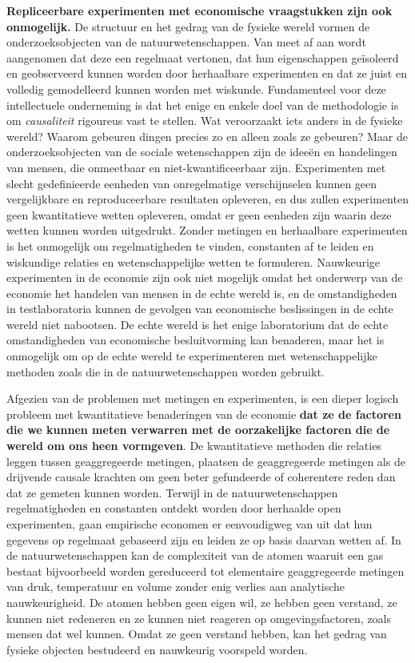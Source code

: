 \textbf{Repliceerbare experimenten met economische vraagstukken zijn ook onmogelijk.} De structuur en het gedrag van de fysieke wereld vormen de onderzoeksobjecten van de natuurwetenschappen. Van meet af aan wordt aangenomen dat deze een regelmaat vertonen, dat hun eigenschappen geïsoleerd en geobserveerd kunnen worden door herhaalbare experimenten en dat ze juist en volledig gemodelleerd kunnen worden met wiskunde. Fundamenteel voor deze intellectuele onderneming is dat het enige en enkele doel van de methodologie is om \textit{causaliteit} rigoureus vast te stellen. Wat veroorzaakt iets anders in de fysieke wereld? Waarom gebeuren dingen precies zo en alleen zoals ze gebeuren? Maar de onderzoeksobjecten van de sociale wetenschappen zijn de ideeën en handelingen van mensen, die onmeetbaar en niet-kwantificeerbaar zijn. Experimenten met slecht gedefinieerde eenheden van onregelmatige verschijnselen kunnen geen vergelijkbare en reproduceerbare resultaten opleveren, en dus zullen experimenten geen kwantitatieve wetten opleveren, omdat er geen eenheden zijn waarin deze wetten kunnen worden uitgedrukt. Zonder metingen en herhaalbare experimenten is het onmogelijk om regelmatigheden te vinden, constanten af te leiden en wiskundige relaties en wetenschappelijke wetten te formuleren. Nauwkeurige experimenten in de economie zijn ook niet mogelijk omdat het onderwerp van de economie het handelen van mensen in de echte wereld is, en de omstandigheden in testlaboratoria kunnen de gevolgen van economische beslissingen in de echte wereld niet nabootsen. De echte wereld is het enige laboratorium dat de echte omstandigheden van economische besluitvorming kan benaderen, maar het is onmogelijk om op de echte wereld te experimenteren met wetenschappelijke methoden zoals die in de natuurwetenschappen worden gebruikt.

Afgezien van de problemen met metingen en experimenten, is een dieper logisch probleem met kwantitatieve benaderingen van de economie \textbf{dat ze de factoren die we kunnen meten verwarren met de oorzakelijke factoren die de wereld om ons heen vormgeven}. De kwantitatieve methoden die relaties leggen tussen geaggregeerde metingen, plaatsen de geaggregeerde metingen als de drijvende causale krachten om geen beter gefundeerde of coherentere reden dan dat ze gemeten kunnen worden. Terwijl in de natuurwetenschappen regelmatigheden en constanten ontdekt worden door herhaalde open experimenten, gaan empirische economen er eenvoudigweg van uit dat hun gegevens op regelmaat gebaseerd zijn en leiden ze op basis daarvan wetten af. In de natuurwetenschappen kan de complexiteit van de atomen waaruit een gas bestaat bijvoorbeeld worden gereduceerd tot elementaire geaggregeerde metingen van druk, temperatuur en volume zonder enig verlies aan analytische nauwkeurigheid. De atomen hebben geen eigen wil, ze hebben geen verstand, ze kunnen niet redeneren en ze kunnen niet reageren op omgevingsfactoren, zoals mensen dat wel kunnen. Omdat ze geen verstand hebben, kan het gedrag van fysieke objecten bestudeerd en nauwkeurig voorspeld worden.

